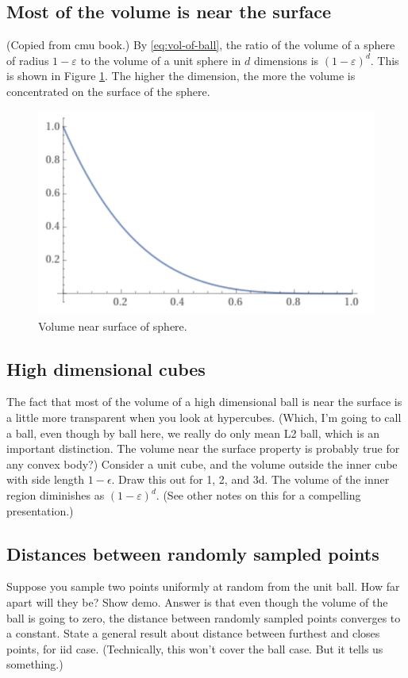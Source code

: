 \documentclass{book}
\newcommand{\eps}{\varepsilon}
\begin{document}
\subsection{Most of the volume is near the surface}
(Copied from cmu book.) By \eqref{eq:vol-of-ball}, the ratio of the volume of a sphere of radius $1-\eps$ to the volume of a unit sphere in $d$ dimensions is $
(1-\eps)^d.$
This is shown in Figure \ref{fig:vol-near-surf}. 
The higher the dimension, the more the volume is concentrated on the surface of the sphere. 
\begin{figure} \label{fig:vol-near-surf}
\centering
\includegraphics[scale = .5]{high_dimensional_space/vol-near-surf.png}
\caption{Volume near surface of sphere.}
\end{figure}

\subsection{High dimensional cubes}
The fact that most of the volume of a high dimensional ball is near the surface is a little more transparent when you look at hypercubes. (Which, I'm going to call a ball, even though by ball here, we really do only mean L2 ball, which is an important distinction. The volume near the surface property is probably true for any convex body?) 
Consider a unit cube, and the volume outside the inner cube with side length $1-\epsilon$. Draw this out for 1, 2, and 3d. The volume of the inner region diminishes as $(1-\eps)^d$. (See other notes on this for a compelling presentation.) 


\subsection{Distances between randomly sampled points}
Suppose you sample two points uniformly at random from the unit ball. How far apart will they be? Show demo. Answer is that even though the volume of the ball is going to zero, the distance between randomly sampled points converges to a constant. State a general result about distance between furthest and closes points, for iid case. (Technically, this won't cover the ball case. But it tells us something.) 
\end{document}

